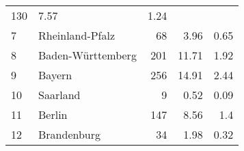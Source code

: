 \begin{longtable}{lXrrr}
       \num{130} &
       \num[round-mode=places,round-precision=2]{7.57} &
         \num[round-mode=places,round-precision=2]{1.24} \\

     7 &
     \multicolumn{1}{X}{ Rheinland-Pfalz   } &


       \num{68} &
       \num[round-mode=places,round-precision=2]{3.96} &
         \num[round-mode=places,round-precision=2]{0.65} \\

     8 &
     \multicolumn{1}{X}{ Baden-Württemberg   } &


       \num{201} &
       \num[round-mode=places,round-precision=2]{11.71} &
         \num[round-mode=places,round-precision=2]{1.92} \\

     9 &
     \multicolumn{1}{X}{ Bayern   } &


       \num{256} &
       \num[round-mode=places,round-precision=2]{14.91} &
         \num[round-mode=places,round-precision=2]{2.44} \\

     10 &
     \multicolumn{1}{X}{ Saarland   } &


       \num{9} &
       \num[round-mode=places,round-precision=2]{0.52} &
         \num[round-mode=places,round-precision=2]{0.09} \\

     11 &
     \multicolumn{1}{X}{ Berlin   } &


       \num{147} &
       \num[round-mode=places,round-precision=2]{8.56} &
         \num[round-mode=places,round-precision=2]{1.4} \\

     12 &
     \multicolumn{1}{X}{ Brandenburg   } &


       \num{34} &
       \num[round-mode=places,round-precision=2]{1.98} &
         \num[round-mode=places,round-precision=2]{0.32} \\


\end{longtable}
